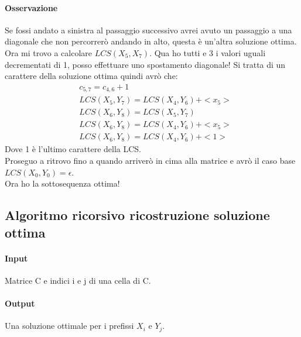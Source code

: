 \paragraph*{Osservazione} Se fossi andato a sinistra al passaggio successivo avrei avuto un passaggio a una 
diagonale che non percorrerò andando in alto, questa è un'altra soluzione ottima.\\
Ora mi trovo a calcolare $LCS(X_5, X_7)$. Qua ho tutti e 3 i valori uguali decrementati di 1, 
posso effettuare uno spostamento diagonale! Si tratta di un carattere della soluzione ottima quindi avrò che:
\begin{align*}
    &c_{5,7} = c_{4,6} + 1\\
    &LCS(X_5,Y_7) = LCS(X_4, Y_6) + <x_5>\\
    &LCS(X_6,Y_8) = LCS(X_5,Y_7)\\
    &LCS(X_6,Y_8) = LCS(X_4,Y_6) + <x_5>\\
    &LCS(X_6,Y_8) = LCS(X_4,Y_6) + <1>
\end{align*}
Dove 1 è l'ultimo carattere della LCS.\\
Proseguo a ritrovo fino a quando arriverò in cima alla matrice e avrò il caso base $LCS(X_0, Y_0) = \epsilon$.\\
Ora ho la sottosequenza ottima!\\
\subsection{Algoritmo ricorsivo ricostruzione soluzione ottima}
\paragraph*{Input} Matrice C e indici i e j di una cella di C.
\paragraph*{Output} Una soluzione ottimale per i prefissi $X_i$ e $Y_j$.

